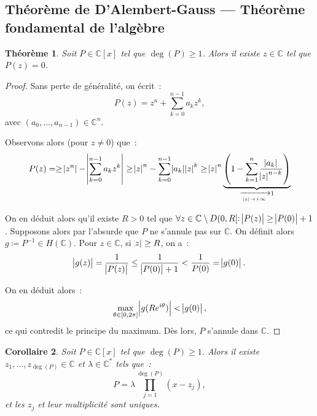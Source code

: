 \documentclass{report}
\newtheorem{thm}{Théorème}[chapter]
\newtheorem{cor}[thm]{Corollaire}
\theoremstyle{definition}
\theoremstyle{remark}
\numberwithin{equation}{section}
\newcommand{\C}{\mathbb C}
\newcommand{\pinfty}{{+\infty}}
\begin{document}
		\subsection{Théorème de D'Alembert-Gauss --- Théorème fondamental de l'algèbre}
			\begin{thm} Soit $P \in \C[x]$ tel que $\deg(P) \geq 1$. Alors il existe $z \in \C$ tel que $P(z) = 0$.
			\end{thm}

			\begin{proof} Sans perte de généralité, on écrit~:
			\begin{equation}
				P(z) = z^n + \sum_{k=0}^{n-1}a_kz^k,
			\end{equation}
			avec $(a_0, \ldots, a_{n-1}) \in \C^n$.

			Observons alors (pour $z \neq 0$) que~:
			\begin{equation}
				P(z) = \geq \abs {z^n} - \abs {\sum_{k=0}^{n-1}a_kz^k} \geq \abs z^n - \sum_{k=0}^{n-1}\abs {a_k}\abs z^k
					\geq \abs z^n\underbrace {\left(1 - \sum_{k=1}^n\frac {\abs {a_k}}{\abs z^{n-k}}\right)}_{\xrightarrow[\abs z \to \pinfty]{} 1}
			\end{equation}

			On en déduit alors qu'il existe $R > 0$ tel que $\forall z \in \C \setminus D(0, R[ : \abs {P(z)} \geq \abs {P(0)} + 1$. Supposons alors par l'absurde que $P$ ne
			s'annule pas sur $\C$. On définit alors $g \coloneqq P^{-1} \in H(\C)$. Pour $z \in \C$, si $\abs z \geq R$, on a~:
			\begin{equation}
				\abs {g(z)} = \frac 1{\abs {P(z)}} \leq \frac 1{\abs {P(0)}+1} < \frac 1{P(0)} = \abs {g(0)}.
			\end{equation}

			On  en déduit alors~:
			\begin{equation}
				\max_{\theta \in [0, 2\pi]}\abs {g(Re^{i\theta})} < \abs {g(0)},
			\end{equation}
			ce qui contredit le principe du maximum. Dès lors, $P$ s'annule dans $\C$.
			\end{proof}

			\begin{cor} Soit $P \in \C[x]$ tel que $\deg(P) \geq 1$. Alors il existe $z_1, \ldots, z_{\deg(P)} \in \C$ et $\lambda \in \C^*$ tels que~:
			\begin{equation}
				P = \lambda \prod_{j=1}^{\deg(P)}(x-z_j),
			\end{equation}
			et les $z_j$ et leur multiplicité sont uniques.
			\end{cor}
\end{document}
